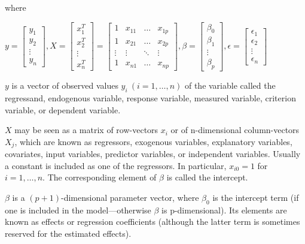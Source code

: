 \documentclass{article}
\begin{document}
\noindent where

\bigskip

\(
y = 
\begin{bmatrix}
y_1\\
y_2\\
\vdots\\
y_n
\end{bmatrix}
,
X = 
\begin{bmatrix}
x_1^T\\
x_2^T\\
\vdots\\
x_n^T
\end{bmatrix} = 
\begin{bmatrix}
1 & x_{11} & \dots & x_{1p}\\
1 & x_{21} & \dots & x_{2p}\\
\vdots & \vdots & \ddots & \vdots\\
1 & x_{n1} & \dots & x_{np}
\end{bmatrix}
,
\beta = 
\begin{bmatrix}
\beta_0\\
\beta_1\\
\vdots\\
\beta_p
\end{bmatrix}
,
\epsilon = 
\begin{bmatrix}
\epsilon_1\\
\epsilon_2\\
\vdots\\
\epsilon_n
\end{bmatrix}
\)

\bigskip

\noindent \(y\) is a vector of observed values \(y_{i}\ (i=1,\ldots ,n)\) of the variable called the regressand, endogenous variable, response variable, measured variable, criterion variable, or dependent variable.

\bigskip

\noindent \(X\) may be seen as a matrix of row-vectors \(x_{i}\) or of n-dimensional column-vectors \(X_{j}\), which are known as regressors, exogenous variables, explanatory variables, covariates, input variables, predictor variables, or independent variables. Usually a constant is included as one of the regressors. In particular, \(x_{i0} = 1\) for \(i = 1, \dots, n\). The corresponding element of \(\beta\) is called the intercept. 

\bigskip

\noindent \(\beta\) is a \((p + 1)\)-dimensional parameter vector, where \(\beta_{0}\) is the intercept term (if one is included in the model—otherwise \(\beta\) is p-dimensional). Its elements are known as effects or regression coefficients (although the latter term is sometimes reserved for the estimated effects).
\end{document}
